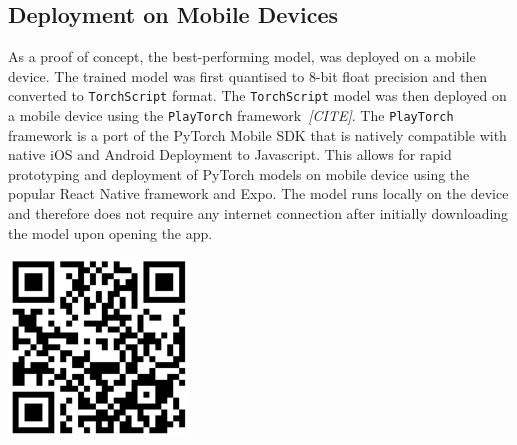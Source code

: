 \documentclass[a4paper]{article}
\begin{document}
  \subsection{Deployment on Mobile Devices}
  \label{sub:deploment}

  \begin{minipage}{0.6\textwidth}
    As a proof of concept, the best-performing model, was deployed on a mobile
    device. The trained model was first quantised to 8-bit float precision and
    then converted to \texttt{TorchScript} format. The \texttt{TorchScript} model
    was then deployed on a mobile device using the \texttt{PlayTorch}
    framework~\textit{[CITE]}. The \texttt{PlayTorch} framework is a port of the
    PyTorch Mobile SDK that is natively compatible with native iOS and Android
    Deployment to Javascript. This allows for rapid prototyping and deployment of
    PyTorch models on mobile device using the popular React Native framework and
    Expo. The model runs locally on the device and therefore does not require any
    internet connection after initially downloading the model upon opening the
    app.
  \end{minipage}
  \hfill%
  \begin{minipage}{0.3\textwidth}
    \includegraphics[width=\linewidth]{./figures/playtorch-qr.png}
  \end{minipage}%
\end{document}
